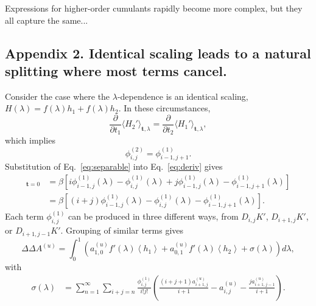\documentclass{article}
\let\vec\mathbf
\begin{document}
Expressions for higher-order cumulants rapidly become more complex, but they all capture the same...





\subsection{Appendix 2. Identical scaling leads to a natural splitting where most terms cancel.}

Consider the case where the $\lambda$-dependence is an identical scaling, $H(\lambda) = f(\lambda)h_1 + f(\lambda)h_2$. In these circumstances,
\begin{equation*}
\frac{\partial}{\partial t_1}
	\langle H_2' \rangle_{\vec t, \lambda} = 
\frac{\partial}{\partial t_2}
	\langle H_1' \rangle_{\vec t, \lambda},
\end{equation*}
which implies
\begin{equation}
\phi_{i,j}^{(2)} = \phi_{i-1,j+1}^{(1)}.
\label{eq:separable}
\end{equation}
Substitution of Eq.~\ref{eq:separable} into Eq.~\ref{eq:deriv} gives
\begin{align}
[D_{i,j}K_\lambda']_{\vec t=0} &=
	\beta\left[
		i \phi_{i-1, j}^{(1)}(\lambda) -
    	\phi_{i,j}^{(1)}(\lambda) +
    	j \phi_{i-1, j}^{(1)}(\lambda) -
    	\phi_{i-1,j+1}^{(1)}(\lambda)
    \right] \nonumber \\
    &=
	\beta\left[
		(i + j)\phi_{i-1, j}^{(1)}(\lambda) -
    	\phi_{i,j}^{(1)}(\lambda) -
    	\phi_{i-1,j+1}^{(1)}(\lambda)
    \right].
\end{align}
Each term $\phi_{i,j}^{(1)}$ can be produced in three different ways, from $D_{i,j}K'$, $D_{i+1,j}K'$, or $D_{i+1,j-1}K'$. Grouping of similar terms gives
\begin{equation}
\Delta\Delta A^{(u)} =
	\int_0^1 \left(
        a_{1,0}^{(u)}f'(\lambda)
        \left\langle h_1 \right\rangle +
        a_{0,1}^{(u)}f'(\lambda)
        \left\langle h_2 \right\rangle +
        \sigma(\lambda)
    \right) d\lambda,
\end{equation}
with
\begin{align}
\sigma(\lambda) &=
	\sum_{n=1}^{\infty}
    \sum_{i+j=n}
        \frac
        	{\phi_{i,j}^{(1)}}
            {i!j!}
        \left(
            \frac
                {(i+j+1)a_{i+1,j}^{(u)}}
                {i+1} -
            a_{i,j}^{(u)} -
           	\frac
            	{j a_{i+1,j-1}^{(u)}}
                {i+1}
		\right).
\label{eq:cancel}
\end{align}
\end{document}
